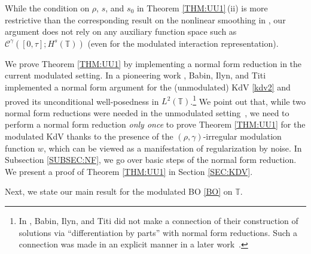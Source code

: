 \documentclass[letterpaper, 11pt,  reqno]{amsart}
\newcommand{\1}{\hspace{0.5mm}\text{I}\hspace{0.5mm}}
\newcommand{\T}{\mathbb{T}}
\newcommand{\g}{\gamma}
\newcommand{\cC}{\mathcal{C}}
\numberwithin{equation}{section}
\numberwithin{theorem}{section}
\begin{document}
While the condition on $\rho$, $s$, and $s_0$
in Theorem \ref{THM:UU1}\,(ii) is more restrictive than
the corresponding result
on the nonlinear smoothing in \cite[Theorem 1.15]{CGLLO1}, 
our argument does not rely
on any auxiliary function space such as 
$\cC^\g([0, \tau]; H^s(\T))$
(even for the modulated interaction representation).


We prove Theorem \ref{THM:UU1}
by implementing a normal form reduction
in the current modulated setting.
In a pioneering work \cite{BIT}, 
Babin, Ilyn, and Titi
implemented  a normal form argument
for the (unmodulated) KdV \eqref{kdv2}
and proved  its unconditional well-posedness 
in $L^2(\T)$.\footnote{In \cite{BIT}, 
Babin, Ilyn, and Titi did not make a connection
of their construction of solutions via ``differentiation by parts''
with 
normal form reductions.
Such a connection was made in an explicit manner
in a later work~\cite{GKO}.}
We point out that, while 
two normal form reductions
were needed in the unmodulated setting~\cite{BIT}, 
we  need to perform a normal form reduction
{\it only once} to prove Theorem \ref{THM:UU1}
for the modulated KdV
thanks to  the presence of the $(\rho, \g)$-irregular modulation function $w$,
which can be viewed as a manifestation
of regularization by noise.
In Subsection \ref{SUBSEC:NF}, we go over basic steps of
the normal form reduction.
We present a proof of Theorem \ref{THM:UU1}
in Section \ref{SEC:KDV}.




\medskip


Next, we state our main  result 
for the modulated BO \eqref{BO} on $\T$.
\end{document}
